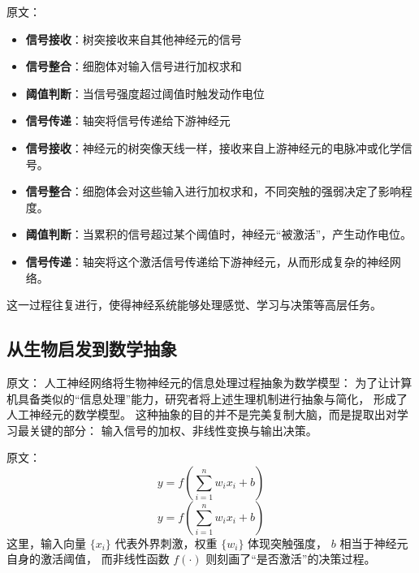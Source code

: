 原文：
\begin{itemize}
\item {\bf 信号接收}：树突接收来自其他神经元的信号
\item {\bf 信号整合}：细胞体对输入信号进行加权求和
\item {\bf 阈值判断}：当信号强度超过阈值时触发动作电位
\item {\bf 信号传递}：轴突将信号传递给下游神经元
\end{itemize}
\begin{itemize}
\item {\bf 信号接收}：神经元的树突像天线一样，接收来自上游神经元的电脉冲或化学信号。
\item {\bf 信号整合}：细胞体会对这些输入进行加权求和，不同突触的强弱决定了影响程度。
\item {\bf 阈值判断}：当累积的信号超过某个阈值时，神经元“被激活”，产生动作电位。
\item {\bf 信号传递}：轴突将这个激活信号传递给下游神经元，从而形成复杂的神经网络。
\end{itemize}
这一过程往复进行，使得神经系统能够处理感觉、学习与决策等高层任务。


\subsection{从生物启发到数学抽象}

原文：
人工神经网络将生物神经元的信息处理过程抽象为数学模型：
为了让计算机具备类似的“信息处理”能力，研究者将上述生理机制进行抽象与简化，  
形成了人工神经元的数学模型。  
这种抽象的目的并不是完美复制大脑，而是提取出对学习最关键的部分：  
输入信号的加权、非线性变换与输出决策。

原文：
\begin{equation}
y = f\left(\sum_{i=1}^{n} w_i x_i + b\right)
\end{equation}
\begin{equation}
y = f\left(\sum_{i=1}^{n} w_i x_i + b\right)
\end{equation}
这里，输入向量 $\{x_i\}$ 代表外界刺激，权重 $\{w_i\}$ 体现突触强度，  
$b$ 相当于神经元自身的激活阈值，  
而非线性函数 $f(\cdot)$ 则刻画了“是否激活”的决策过程。

